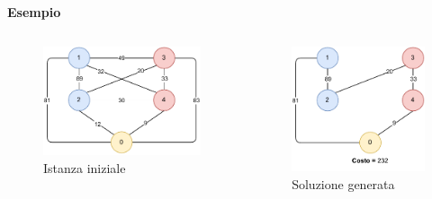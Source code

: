 \documentclass[9pt]{beamer}
\begin{document}
\begin{frame}[allowframebreaks]{\subsecname}
\textbf{Esempio}
\begin{columns}[T,onlytextwidth]
	\begin{figure}[h]
	\centering
	\includegraphics[height=0.4\textheight]
	{../images/graph-tsppd-with-two-customers}	
	\caption{Istanza iniziale}
	\end{figure}
	\begin{figure}[h]
	\centering
	\includegraphics[height=0.4\textheight]
	{../images/graph-greedy-pickup-first-solution-tsppd-with-two-customers}	
	\caption{Soluzione generata}
	\end{figure}
\end{columns}

\framebreak


\end{frame}
\end{document}
